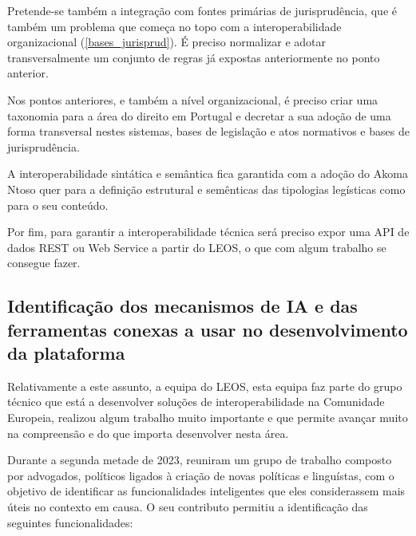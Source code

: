 Pretende-se também a integração com fontes primárias de jurisprudência, que é também um problema 
que começa no topo com a interoperabilidade organizacional (\ref{bases_jurisprud}). É preciso normalizar 
e adotar transversalmente um conjunto de regras já expostas anteriormente no ponto anterior.

Nos pontos anteriores, e também a nível organizacional, é preciso criar uma taxonomia para a área do direito em 
Portugal e decretar a sua adoção de uma forma transversal nestes sistemas, bases de legislação e atos normativos e bases 
de jurisprudência.

A interoperabilidade sintática e semântica fica garantida com a adoção do Akoma Ntoso \cite{AkomaNtoso2018} 
quer para a definição estrutural e semênticas das tipologias legísticas como para o seu conteúdo.

Por fim, para garantir a interoperabilidade técnica será preciso expor uma API de dados REST ou Web
Service a partir do LEOS, o que com algum trabalho se consegue fazer.


\subsection{Identificação dos mecanismos de IA e das ferramentas conexas a usar no desenvolvimento
da plataforma}

Relativamente a este assunto, a equipa do LEOS, esta equipa faz parte do grupo técnico que está a 
desenvolver soluções de interoperabilidade na Comunidade Europeia, realizou algum trabalho muito 
importante e que permite avançar muito na compreensão e do que importa desenvolver nesta área.

Durante a segunda metade de 2023, reuniram um grupo de trabalho composto por advogados, 
políticos ligados à criação de novas políticas e linguístas, com o objetivo de identificar 
as funcionalidades inteligentes que eles considerassem mais úteis no contexto em causa.
O seu contributo permitiu a identificação das seguintes funcionalidades:

